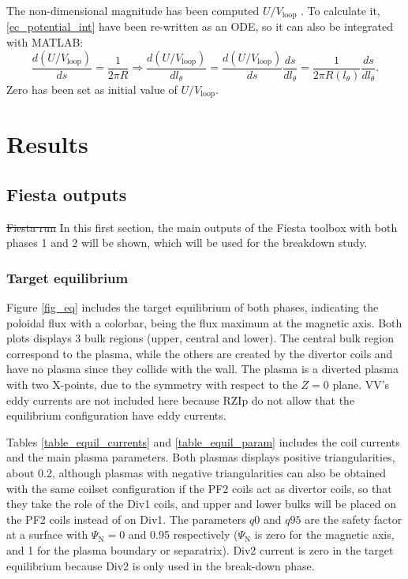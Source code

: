\documentclass[a4paper,12pt,oneside]{book}
\begin{document}
The non-dimensional magnitude has been computed $U/V_\text{loop}$ \cite{Lazarus_1998}. To calculate it, \eqref{ec_potential_int} have been re-written as an ODE, so it can also be integrated with MATLAB:
%
\begin{equation}
\dfrac{d(U/V_\text{loop})}{ds}= \dfrac{1}{2 \pi R} \Rightarrow \dfrac{d(U/V_\text{loop})}{d l_\theta }=\dfrac{d(U/V_\text{loop})}{ds} \dfrac{ds}{d l_\theta}= \dfrac{1}{2 \pi R(l_\theta)} \dfrac{ds}{d l_\theta} .
\end{equation}
Zero has been set as initial value of $U/V_\text{loop}$.



\chapter{Results}
\label{sec_results}
\section{Fiesta outputs }
\st{Fiesta run}
In this first section, the main outputs of the Fiesta toolbox with both phases 1 and 2 will be shown, which will be used for the breakdown study.

\subsection{Target equilibrium}

Figure \ref{fig_eq} includes the target equilibrium of both phases, indicating the poloidal flux with a colorbar, being the flux maximum at the magnetic axis. Both plots displays 3 bulk regions (upper, central and lower). The central bulk region correspond to the plasma, while the others are created by the divertor coils and have no plasma since they collide with the wall. The plasma is a diverted plasma with two X-points, due to the symmetry with respect to the $Z=0$ plane. VV's eddy currents are not included here because RZIp do not allow that the equilibrium configuration have eddy currents. 

Tables \ref{table_equil_currents} and \ref{table_equil_param} includes the coil currents and the main plasma parameters. Both plasmas displays positive triangularities, about 0.2, although plasmas with negative triangularities can also be obtained with the same coilset configuration if the PF2 coils act as divertor coils, so that they take the role of the Div1 coils, and upper and lower bulks will be placed on the PF2 coils instead of on Div1. The parameters $q0$ and $q95$ are the safety factor at a surface with $\Psi_\text{N}=$0 and 0.95 respectively ($\Psi_\text{N}$ is zero for the magnetic axis, and 1 for the plasma boundary or separatrix). Div2 current is zero in the target equilibrium because Div2 is only used in the break-down phase.
\end{document}
